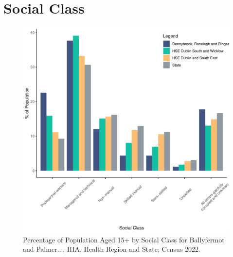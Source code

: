 \documentclass{article}
\begin{document}
\section{Social Class}\label{sect:SC}
\begin{figure}[H]
	\centering
	\includegraphics[width = 140mm]{../figures/SocialClassED.pdf}
	\caption{Percentage of Population Aged 15+ by Social Class for Ballyfermot and Palmer..., IHA, Health Region and State; Census 2022.}
	\label{fig:vbnv}
	\end{figure}
\end{document}
